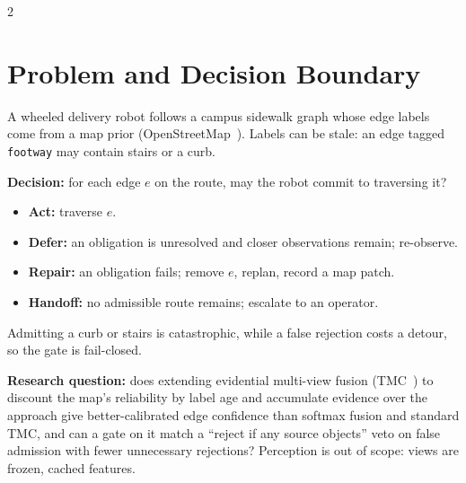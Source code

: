 \documentclass[10pt]{article}
\newcommand{\cl}[1]{\texttt{#1}}
\begin{document}
\begin{multicols*}{2}

\section{Problem and Decision Boundary}

A wheeled delivery robot follows a campus sidewalk graph whose edge labels come from a map prior
(OpenStreetMap~\cite{osm}). Labels can be stale: an edge tagged \cl{footway} may contain stairs or a curb.

\textbf{Decision:} for each edge $e$ on the route, may the robot commit to traversing it?
\begin{itemize}\setlength\itemsep{0pt}\setlength\parskip{0pt}
	\item \textbf{Act:} traverse $e$.
	\item \textbf{Defer:} an obligation is unresolved and closer observations remain; re-observe.
	\item \textbf{Repair:} an obligation fails; remove $e$, replan, record a map patch.
	\item \textbf{Handoff:} no admissible route remains; escalate to an operator.
\end{itemize}
Admitting a curb or stairs is catastrophic, while a false rejection costs a detour, so the gate is
fail-closed.

\textbf{Research question:} does extending evidential multi-view fusion (TMC~\cite{han2023}) to discount
the map's reliability by label age and accumulate evidence over the approach give better-calibrated edge confidence
than softmax fusion and standard TMC, and can a gate on it match a ``reject if any source objects'' veto
on false admission with fewer unnecessary rejections? Perception is out of scope: views are frozen,
cached features.


\end{multicols*}
\end{document}

